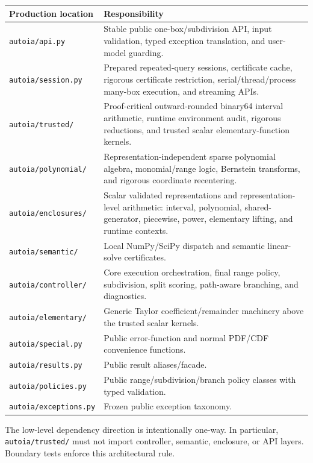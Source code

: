 \documentclass[11pt]{article}
\newcommand{\codepath}[1]{\nolinkurl{#1}}
\begin{document}
\begin{longtable}{p{}p{}}
\toprule
Production location & Responsibility \\
\midrule
\endhead
\codepath{autoia/api.py} & Stable public one-box/subdivision API, input validation, typed exception translation, and user-model guarding. \\
\codepath{autoia/session.py} & Prepared repeated-query sessions, certificate cache, rigorous certificate restriction, serial/thread/process many-box execution, and streaming APIs. \\
\codepath{autoia/trusted/} & Proof-critical outward-rounded binary64 interval arithmetic, runtime environment audit, rigorous reductions, and trusted scalar elementary-function kernels. \\
\codepath{autoia/polynomial/} & Representation-independent sparse polynomial algebra, monomial/range logic, Bernstein transforms, and rigorous coordinate recentering. \\
\codepath{autoia/enclosures/} & Scalar validated representations and representation-level arithmetic: interval, polynomial, shared-generator, piecewise, power, elementary lifting, and runtime contexts. \\
\codepath{autoia/semantic/} & Local NumPy/SciPy dispatch and semantic linear-solve certificates. \\
\codepath{autoia/controller/} & Core execution orchestration, final range policy, subdivision, split scoring, path-aware branching, and diagnostics. \\
\codepath{autoia/elementary/} & Generic Taylor coefficient/remainder machinery above the trusted scalar kernels. \\
\codepath{autoia/special.py} & Public error-function and normal PDF/CDF convenience functions. \\
\codepath{autoia/results.py} & Public result aliases/facade. \\
\codepath{autoia/policies.py} & Public range/subdivision/branch policy classes with typed validation. \\
\codepath{autoia/exceptions.py} & Frozen public exception taxonomy. \\
\bottomrule
\end{longtable}

The low-level dependency direction is intentionally one-way.  In particular,
\codepath{autoia/trusted/} must not import controller, semantic, enclosure, or API
layers.  Boundary tests enforce this architectural rule.
\end{document}
